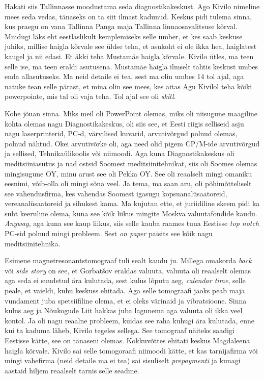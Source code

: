Hakati siis Tallinnasse moodustama seda 
diagnostikakeskust. Ago Kivilo 
nimeline mees seda vedas, tänaseks on ta siit ilmast kadunud. Keskus pidi tulema 
sinna, kus praegu on vana Tallinna Panga maja Tallinna linnaosavalitsuse 
kõrval. Muidugi läks eht eestlaslikult kemplemiseks selle ümber, et kes 
saab keskuse juhiks, millise haigla kõrvale see üldse teha, et asukoht ei ole 
ikka hea, haiglatest kaugel ja nii edasi. Et äkki teha Mustamäe haigla kõrvale. 
Kivilo ütles, ma teen selle ise, ma teen eraldi asutusena. Mustamäe haigla 
ilmselt tahtis keskust umbes enda allasutuseks. Ma neid detaile ei tea, sest ma 
olin umbes 14 tol ajal, aga natuke tean selle pärast, et mina olin see mees, 
kes aitas Agu Kivilol teha kõiki powerpointe, mis tal oli vaja teha. Tol ajal 
see oli \emph{skill}. 


Kohe jõuan sinna. Miks meil oli PowerPoint olemas, miks oli niisugune maagiline 
kohta olemas nagu Diagnostikakeskus, oli siis see, et Eesti riigis selliseid 
asju nagu laserprinterid, PC-d, värvilised kuvarid, arvutivõrgud polnud olemas, polnud 
nähtud. Okei arvutivõrke oli, aga need olid pigem 
CP/M-ide arvutivõrgud ja sellised, Tehnikaülikoolis või niimoodi. Aga kuna 
Diagnostikakeskus oli meditsiiniasutus ja  nad ostsid Soomest 
meditsiinitehnikat, siis oli Soomes olemas  mingisugune OY, minu arust see oli 
Pekka OY. See oli reaalselt mingi omaniku eesnimi,  võib-olla oli mingi sõna 
veel. Ja tema, ma saan aru, oli põhimõtteliselt see vahendusfirma, kes vahendas 
Soomest igasugu kopsuanalüsaatoreid, vereanalüsaatoreid ja sihukest kama. Ma kujutan 
ette, et juriidiline skeem pidi ka suht keeruline olema, kuna see kõik liikus 
mingite Moskva valuutafondide kaudu. \emph{Anyway}, aga kuna see kaup liikus, 
siis selle kauba raames tuua Eestisse \emph{top notch} PC-sid polnud mingi probleem. 
Sest \emph{on paper} paisits see kõik nagu meditsiinitehnika. 


Esimene magnetresonantstomograaf tuli sealt kaudu ju. Millega omakorda 
\emph{back} või \emph{side story} on see, et Gorbatšov eraldas valuuta, valuuta 
oli reaalselt olemas aga seda ei suudetud ära kulutada, sest kulus lõputu aeg, 
\emph{calendar time}, selle peale, et vaieldi, kuhu  keskuss ehitada. Aga 
selle tomograafi jaoks peab maja vundament juba spetsiifiline olema, et ei oleks 
värinaid ja vibratsioone. Sinna kulus aeg ja Nõukogude Liit hakkas juba lagunema 
aga valuuta oli ikka veel kontol. Ja oli nagu reaalne probleem, kuidas see 
raha kuhugi ära kulutada, enne kui ta kaduma läheb,  
Kivilo tegeles sellega. See tomograaf näiteks saadigi 
Eestisse kätte, see on tänaseni olemas. Kokkuvõttes ehitati keskus  Magdaleena 
haigla kõrvale. Kivilo sai selle tomogoraafi niimoodi kätte, et kas   
tarnijafirma või mingi vahefirma (neid detaile ma ei tea) sai sisuliselt 
\emph{prepaymenti} ja kunagi aastaid hiljem reaalselt tarnis selle seadme. 

